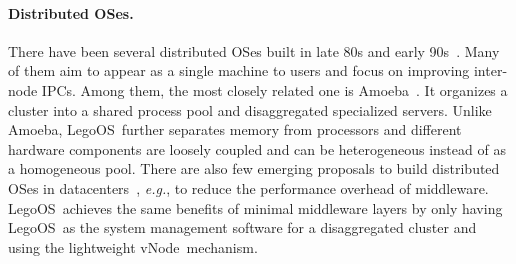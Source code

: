 \documentclass[10pt,times,twocolumn]{z2-article}
\newcommand{\eg}{\textit{e.g.}}
\newcommand{\lego}{LegoOS}
\newcommand{\vnode}{vNode}
\providecommand{\DIFdelbegin}{} %
\providecommand{\DIFdelend}{} %
\newcommand{\DIFscaledelfig}{0.5}
\newlength{\DIFdelgraphicswidth} %
\newlength{\DIFdelgraphicsheight} %
\newcommand{\DIFdelincludegraphics}[2][]{%
\sbox{\DIFdelgraphicsbox}{\DIFOincludegraphics[#1]{#2}}%
\settoboxwidth{\DIFdelgraphicswidth}{\DIFdelgraphicsbox} %
\settoboxtotalheight{\DIFdelgraphicsheight}{\DIFdelgraphicsbox} %
\scalebox{\DIFscaledelfig}{%
\parbox[b]{\DIFdelgraphicswidth}{\usebox{\DIFdelgraphicsbox}\\[-\baselineskip] \rule{\DIFdelgraphicswidth}{0em}}\llap{\resizebox{\DIFdelgraphicswidth}{\DIFdelgraphicsheight}{%
\setlength{\unitlength}{\DIFdelgraphicswidth}%
\begin{picture}(1,1)%
\thicklines\linethickness{2pt} %
{\color[rgb]{1,0,0}\put(0,0){\framebox(1,1){}}}%
{\color[rgb]{1,0,0}\put(0,0){\line( 1,1){1}}}%
{\color[rgb]{1,0,0}\put(0,1){\line(1,-1){1}}}%
\end{picture}%
}\hspace*{3pt}}} %
} %
\DeclareRobustCommand{\DIFdelbegin}{\DIFOdelbegin \let\includegraphics\DIFdelincludegraphics} %
\DeclareRobustCommand{\DIFdelend}{\DIFOaddend \let\includegraphics\DIFOincludegraphics} %
\begin{document}
{{{{{{{%
\DIFdelend \paragraph{Distributed OSes.}
There have been several distributed OSes built in late 80s and early 90s~\cite{Amoeba-Status,Amoeba-Experience,Sprite,MOSIX,V-System,Accent-SOSP,DEMOS-SOSP,Charlotte}.
Many of them aim to appear as a single machine to users and focus on improving inter-node IPCs. 
Among them, the most closely related one is Amoeba~\cite{Amoeba-Status,Amoeba-Experience}.
It organizes a cluster into a shared process pool and disaggregated specialized servers.
Unlike Amoeba, \lego\ further separates memory from processors and different hardware components are
loosely coupled and can be heterogeneous instead of as a homogeneous pool.
There are also few emerging proposals to build distributed OSes in datacenters~\cite{Wolfgang-hotcloud18,Schwarzkopf-apsys13}, 
\eg, to reduce the performance overhead of middleware.
\lego\ achieves the same benefits of minimal middleware layers by only 
having \lego\ as the system management software for a disaggregated cluster
and using the lightweight \vnode\ mechanism.
\DIFdelbegin %

}}}}}}}
\end{document}
